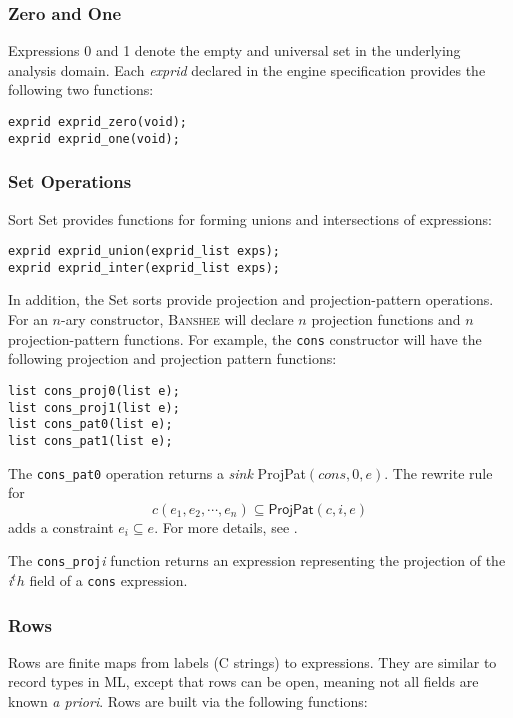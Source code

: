 \documentclass{article}
\newcommand{\banshee}{\textsc{Banshee}}
\newcommand{\Set}{\textsf{Set}}
\newcommand{\id}[1]{{\it #1\/}}
\newcommand{\ProjPat}{\textsf{ProjPat}}
\begin{document}
\subsubsection{Zero and One}

Expressions 0 and 1 denote the empty and universal set in the underlying 
analysis domain. Each \id{exprid} declared in the engine specification 
provides the following two functions:

\begin{verbatim}
exprid exprid_zero(void);
exprid exprid_one(void);
\end{verbatim}

\subsubsection{Set Operations}

Sort \Set{} provides functions for forming unions and intersections of 
expressions:
\begin{verbatim}
exprid exprid_union(exprid_list exps);
exprid exprid_inter(exprid_list exps);
\end{verbatim}
In addition, the \Set{} sorts provide projection and projection-pattern 
operations. For an $n$-ary constructor, \banshee{} will declare $n$ projection 
functions and $n$ projection-pattern functions. For example, the \texttt{cons}
constructor will have the following projection and projection pattern 
functions:
\begin{verbatim}
list cons_proj0(list e);
list cons_proj1(list e);
list cons_pat0(list e);
list cons_pat1(list e);
\end{verbatim}
The \texttt{cons\_pat0} operation returns a \emph{sink} \ProjPat{}$(cons,0,e)$.
The rewrite rule for
$$
   c(e_1,e_2,\cdots,e_n) \subseteq \ProjPat{}(c,i,e) 
$$
adds a constraint $e_i \subseteq e$. For more details, see \cite{su:popl00}.

The \texttt{cons\_proj}\emph{i} function returns an expression 
representing the projection of the \emph{i}$^th$ field of a 
\texttt{cons} expression.

\subsubsection{Rows}

Rows are finite maps from labels (C strings) to expressions. They are
similar to record types in ML, except that rows can be open, meaning
not all fields are known \emph{a priori}. Rows are built via the following 
functions:
\end{document}
